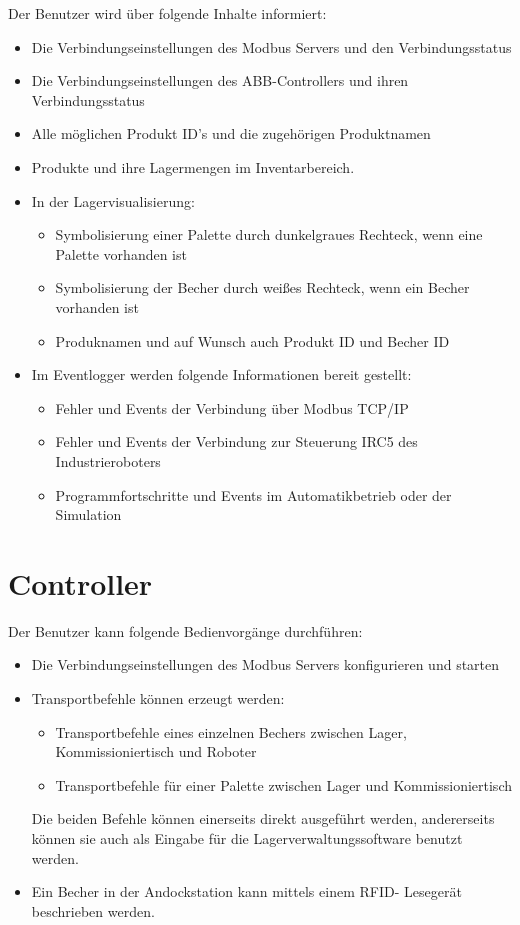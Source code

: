 Der Benutzer wird über folgende Inhalte informiert:

\begin{itemize}
    \item Die Verbindungseinstellungen des Modbus Servers und den Verbindungsstatus
    \item Die Verbindungseinstellungen des ABB-Controllers und ihren Verbindungsstatus
    \item Alle möglichen Produkt ID's und die zugehörigen Produktnamen
    \item Produkte und ihre Lagermengen im Inventarbereich.
    \item In der Lagervisualisierung:
    \begin{itemize}
        \item Symbolisierung einer Palette durch dunkelgraues Rechteck, wenn eine Palette vorhanden ist
        \item Symbolisierung der Becher durch weißes Rechteck, wenn ein Becher vorhanden ist
        \item Produknamen und auf Wunsch auch Produkt ID und Becher ID
    \end{itemize}
    \item Im Eventlogger werden folgende Informationen bereit gestellt:
    \begin{itemize}
        \item Fehler und Events der Verbindung über Modbus TCP/IP
        \item Fehler und Events der Verbindung zur Steuerung IRC5 des Industrieroboters
        \item Programmfortschritte und Events im Automatikbetrieb oder der Simulation
    \end{itemize}
\end{itemize}

\section{Controller}

Der Benutzer kann folgende Bedienvorgänge durchführen:

\begin{itemize}
    \item Die Verbindungseinstellungen des Modbus Servers konfigurieren und starten
    \item Transportbefehle können erzeugt werden:
    \begin{itemize}
        \item Transportbefehle eines einzelnen Bechers zwischen Lager, Kommissioniertisch und Roboter
        \item Transportbefehle für einer Palette zwischen Lager und Kommissioniertisch
    \end{itemize}
    Die beiden Befehle können einerseits direkt ausgeführt werden, andererseits können sie auch als Eingabe für die
    Lagerverwaltungssoftware benutzt werden.
    \item Ein Becher in der Andockstation kann mittels einem RFID- Lesegerät beschrieben werden.
\end{itemize}

